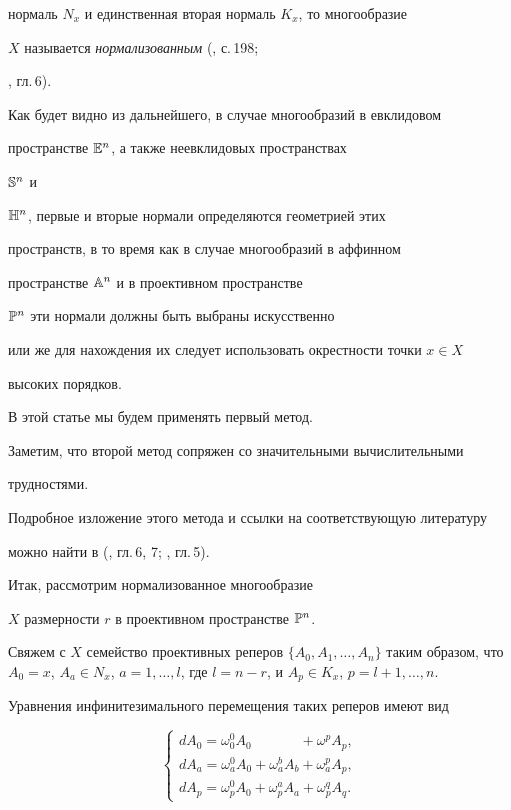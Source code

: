 нормаль $N_x$ и единственная вторая нормаль $K_x$, то многообразие


$X$ называется {\it нормализованным} (\cite{N76}, с.\,198;


\cite{AG93}, гл.\,6).



Как будет видно из дальнейшего, в случае многообразий в евклидовом


пространстве $\Bbb{E}^n$, а также неевклидовых пространствах


$\Bbb{S}^n$ и


$\Bbb{H}^n$, первые и вторые нормали определяются геометрией этих


пространств, в то время как в случае многообразий в аффинном


пространстве $\Bbb{A}^n$ и в проективном пространстве


$\Bbb{P}^n$ эти нормали должны быть выбраны искусственно


или же для нахождения их следует использовать окрестности точки $x \in X$


высоких порядков.


 В этой статье мы будем применять первый метод.


 Заметим, что второй метод сопряжен со значительными вычислительными


трудностями.


 Подробное изложение этого метода и ссылки на соответствующую литературу


можно найти в (\cite{AG93}, гл.\,6, 7; \cite{N76}, гл.\,5).





 Итак, рассмотрим нормализованное многообразие


$X$ размерности $r$ в проективном пространстве $\Bbb{P}^n$.


 Свяжем с $X$ семейство проективных реперов $\{A_0, A_1, \dotsc ,


A_n\}$ таким образом, что $A_0 = x$, $A_a \in N_x$, $a = 1, \dotsc,


l$, где $l = n - r$, и $A_p \in K_x$, $ p = l + 1, \dotsc, n$.


Уравнения инфинитезимального перемещения таких реперов имеют вид


\begin{equation}\label{eq:25}
\begin{cases}
dA_0 = \omega_0^0 A_0 \phantom{+ \omega_a^b A_b.}


\ + \omega^p A_p , \\
dA_a = \omega_a^0 A_0 + \omega_a^b A_b + \omega^p_a A_p, \\
dA_p = \omega_p^0 A_0 + \omega^a_p A_a + \omega_p^q A_q.


\end{cases}
\end{equation}



